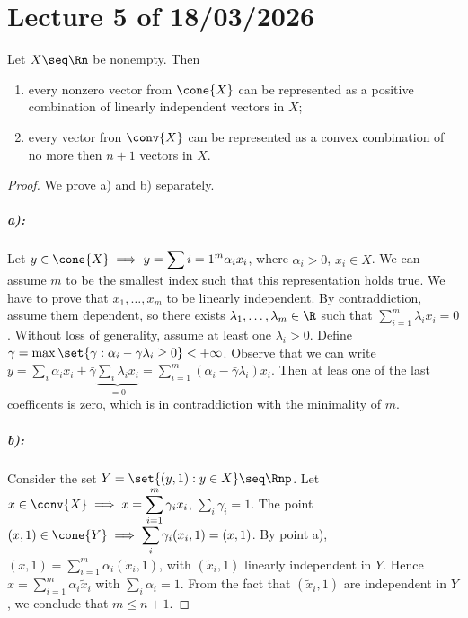 \chapter{Lecture 5 of 18/03/2026}

\begin{theorem}[Charateodory]

    Let $X \seq \Rn$ be nonempty. Then
    
    \begin{enumerate}
        \item[a)] every nonzero vector from $\cone{X}$ can be represented as a positive combination of linearly independent vectors in $X$;
        \item[b)] every vector fron $\conv{X}$ can be represented as a convex combination of no more then $n+1$ vectors in $X$.
    \end{enumerate}
    
\end{theorem}

\begin{proof}
    
    We prove a) and b) separately.

    \paragraph{a):} Let $y \in \cone{X} \implies y = \displaystyle\sum{i=1}^m \alpha_i x_i$, where $\alpha_i > 0$, $x_i \in X$. We can assume $m$ to be the smallest index such that this representation holds true. We have to prove that $x_1,\dots,x_m$ to be linearly independent. By contraddiction, assume them dependent, so there exists $\lambda_1,\dots,\lambda_m \in \R$ such that $\displaystyle\sum_{i=1}^m \lambda_i x_i = 0$. Without loss of generality, assume at least one $\lambda_i > 0$. Define $\bar{\gamma} = \max\set{\gamma : \alpha_i -\gamma\lambda_i \ge 0} < +\infty$. Observe that we can write $y = \displaystyle\sum_i \alpha_i x_i + \bar{\gamma} \underbrace{\displaystyle\sum_i \lambda_i x_i}_{=0} = \displaystyle\sum_{i=1}^m (\alpha_i - \bar{\gamma}\lambda_i)x_i$. Then at leas one of the last coefficents is zero, which is in contraddiction with the minimality of $m$.

    \paragraph{b):} Consider the set $Y = \set{(y,1) : y \in X} \seq \Rnp$. Let $x \in \conv{X} \implies x = \displaystyle\sum_{i=1}^m \gamma_i x_i$, $\displaystyle\sum_i\gamma_i = 1$. The point $(x,1) \in \cone{Y} \implies \displaystyle\sum_i \gamma_i (x_i,1) = (x,1)$. By point a), $(x,1) = \displaystyle\sum_{i=1}^m \alpha_i(\tilde{x}_i,1)$, with $(\tilde{x}_i,1)$ linearly independent in $Y$. Hence $x = \displaystyle\sum_{i=1}^m \alpha_i \tilde{x}_i$ with $\displaystyle\sum_i \alpha_i = 1$. From the fact that $(\tilde{x}_i,1)$ are independent in $Y$, we conclude that $m \le n+1$.

\end{proof}

